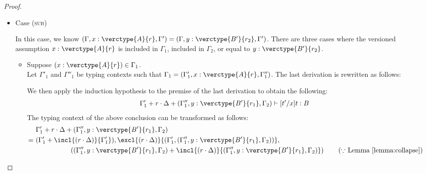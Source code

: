 \begin{proof}
\begin{itemize}
\item Case (\textsc{sub})
\begin{center}
    \begin{minipage}{.55\linewidth}
    \end{minipage}
\end{center}
In this case, we know $(\Gamma, x:\verctype{A}{r}, \Gamma') = (\Gamma, y:\verctype{B'}{r_2}, \Gamma')$.
There are three cases where the versioned assumption $x:\verctype{A}{r}$ is included in $\Gamma_1$, included in $\Gamma_2$, or equal to $y:\verctype{B'}{r_2}$.
\begin{itemize}
\item Suppose $(x:\verctype{A}{r})\in\Gamma_1$.\\
Let $\Gamma'_1$ and $\Gamma''_1$ be typing contexts such that $\Gamma_1 = (\Gamma'_1, x:\verctype{A}{r}, \Gamma''_1)$.
The last derivation is rewritten as follows:
\begin{center}
    \begin{minipage}{.75\linewidth}
    \end{minipage}
\end{center}
We then apply the induction hypothesis to the premise of the last derivation to obtain the following:
\begin{align}
\label{eq:subset1}
\Gamma'_1 + r\cdot\Delta + (\Gamma''_1, y:\verctype{B'}{r_1}, \Gamma_2) \vdash [t'/x]t : B
\end{align}
The typing context of the above conclusion can be transformed as follows:
\begin{align*}
&\Gamma'_1 + r\cdot\Delta + (\Gamma''_1, y:\verctype{B'}{r_1}, \Gamma_2)\\
=\ &(\Gamma'_1+\incl{(r\cdot\Delta)}{\Gamma'_1}),\excl{(r\cdot\Delta)}{(\Gamma'_1,(\Gamma''_1, y:\verctype{B'}{r_1}, \Gamma_2))},\\
&\hspace{5em} \left((\Gamma''_1, y:\verctype{B'}{r_1}, \Gamma_2)+\incl{(r\cdot\Delta)}{(\Gamma''_1, y:\verctype{B'}{r_1}, \Gamma_2)}\right) \tag{$\because$ Lemma \ref{lemma:collapse}}\\

\end{align*}
\end{itemize}
\end{itemize}
\end{proof}
